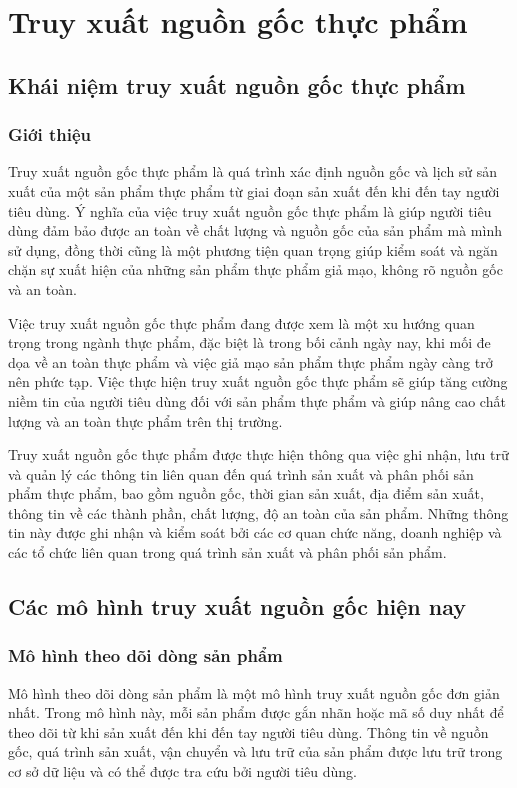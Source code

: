 \chapter{Truy xuất nguồn gốc thực phẩm}
\label{Chapter2}
\section{Khái niệm truy xuất nguồn gốc thực phẩm}
\subsection{Giới thiệu}

Truy xuất nguồn gốc thực phẩm là quá trình xác định nguồn gốc và lịch sử sản xuất
của một sản phẩm thực phẩm từ giai đoạn sản xuất đến khi đến tay người tiêu dùng. Ý
nghĩa của việc truy xuất nguồn gốc thực phẩm là giúp người tiêu dùng đảm bảo được
an toàn về chất lượng và nguồn gốc của sản phẩm mà mình sử dụng, đồng thời cũng là
một phương tiện quan trọng giúp kiểm soát và ngăn chặn sự xuất hiện của những sản
phẩm thực phẩm giả mạo, không rõ nguồn gốc và an toàn.

Việc truy xuất nguồn gốc thực phẩm đang được xem là một xu hướng quan trọng
trong ngành thực phẩm, đặc biệt là trong bối cảnh ngày nay, khi mối đe dọa về an toàn
thực phẩm và việc giả mạo sản phẩm thực phẩm ngày càng trở nên phức tạp. Việc thực
hiện truy xuất nguồn gốc thực phẩm sẽ giúp tăng cường niềm tin của người tiêu dùng
đối với sản phẩm thực phẩm và giúp nâng cao chất lượng và an toàn thực phẩm trên thị
trường.

Truy xuất nguồn gốc thực phẩm được thực hiện thông qua việc ghi nhận, lưu trữ
và quản lý các thông tin liên quan đến quá trình sản xuất và phân phối sản phẩm thực
phẩm, bao gồm nguồn gốc, thời gian sản xuất, địa điểm sản xuất, thông tin về các thành
phần, chất lượng, độ an toàn của sản phẩm. Những thông tin này được ghi nhận và kiểm
soát bởi các cơ quan chức năng, doanh nghiệp và các tổ chức liên quan trong quá trình
sản xuất và phân phối sản phẩm.

\section{Các mô hình truy xuất nguồn gốc hiện nay}
\subsection{Mô hình theo dõi dòng sản phẩm }
Mô hình theo dõi dòng sản phẩm là một mô hình 
truy xuất nguồn gốc đơn giản nhất. Trong mô hình này, mỗi sản phẩm được gắn 
nhãn hoặc mã số duy nhất để theo dõi từ khi sản xuất đến khi đến tay người 
tiêu dùng. Thông tin về nguồn gốc, quá trình sản xuất, vận chuyển và lưu trữ 
của sản phẩm được lưu trữ trong cơ sở dữ liệu và có thể được tra cứu bởi người tiêu dùng.

